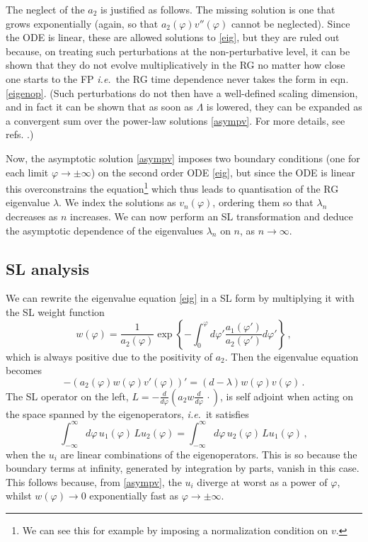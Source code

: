 \documentclass[11pt,a4paper]{article}
\numberwithin{figure}{section}
\numberwithin{equation}{section}
\newcommand{\be}{\begin{equation}}
\newcommand{\ee}{\end{equation}}
\newcommand\ie{\textit{i.e.}\ }
\newcommand{\ph}{\varphi}
\begin{document}
The neglect of the $a_2$ is justified as follows.
The missing solution is one that grows exponentially (again, so that $a_2(\ph) v''(\ph)$ cannot be neglected). Since the ODE is linear, these are allowed solutions to \eqref{eig}, but they are ruled out because, on treating such perturbations at the non-perturbative level, it can be shown that they do not evolve multiplicatively in the RG no matter how close one starts to the FP \cite{Morris:1996nx,Morris:1998,Morris:1996xq,Bridle:2016nsu,Mitchell:2021qjr,Morris:2022btf} \ie the RG time dependence never takes the form in eqn. \eqref{eigenop}. (Such perturbations do not then have a well-defined scaling dimension, and in fact it can be shown that as soon as $\Lambda$ is lowered, they can be expanded as a convergent sum over the power-law solutions \eqref{asympv}. For more details, see refs. \cite{Morris:1996nx,Morris:1998,Morris:1996xq,Bridle:2016nsu,Mitchell:2021qjr,Morris:2022btf}.)

Now, the asymptotic solution \eqref{asympv} imposes two boundary conditions (one for each limit $\ph\to\pm\infty$) on the second order ODE \eqref{eig}, but since the ODE is linear this overconstrains the equation\footnote{We can see this for example by imposing a normalization condition on $v$.} which thus leads to quantisation of the RG eigenvalue $\lambda$. We index the solutions as $v_n(\ph)$, ordering them so that $\lambda_n$ decreases as $n$ increases. We can now perform an SL transformation and deduce the asymptotic dependence of the eigenvalues $\lambda_n$ on $n$, as $n\to\infty$.

\subsection{SL analysis}

We can rewrite the eigenvalue equation \eqref{eig} in a SL form by multiplying it with the SL weight function
\begin{equation} \label{weight}
    w(\ph)=\frac{1}{a_2(\ph)}\exp \left\{-\int_0^\ph d\ph' \frac{a_1(\ph')}{a_2(\ph')} d\ph' \right\} \,,
\end{equation}
which is always positive due to the positivity of $a_2$. Then the eigenvalue equation becomes
\begin{equation}
    -\left(a_2(\ph)w(\ph)v'(\ph) \right)'=(d-\lambda) w(\ph)v(\ph)\,. \label{SL}
\end{equation}
The SL operator on the left, $L=-\frac{d}{d\ph}\left( a_2 w \frac{d}{d\ph}\,\cdot \right)$, is self adjoint when acting on the space spanned by the eigenoperators, \ie it satisfies
\be \int^\infty_{-\infty}\!\!\!\!\!d\ph\, u_1(\ph)\, L u_2(\ph) = \int^\infty_{-\infty}\!\!\!\!\!d\ph\, u_2(\ph)\, L u_1(\ph)\,,\ee  
when the $u_i$ are linear combinations of the eigenoperators. This is so because the boundary terms at infinity, generated by integration by parts, vanish in this case. This follows because, from \eqref{asympv}, the $u_i$ diverge at worst as a power of $\ph$, whilst $w(\ph) \rightarrow 0$ exponentially fast as $\ph\rightarrow \pm \infty$. 
\end{document}
